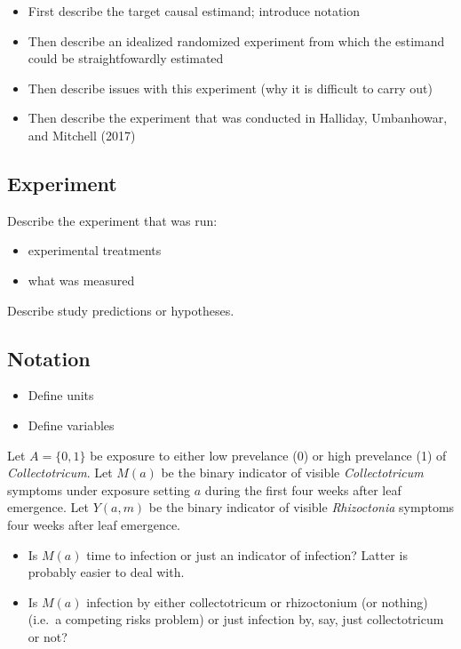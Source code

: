 \documentclass[]{article}
\providecommand{\tightlist}{%
  \setlength{\itemsep}{0pt}\setlength{\parskip}{0pt}}
\begin{document}
\begin{itemize}
\tightlist
\item
  First describe the target causal estimand; introduce notation
\item
  Then describe an idealized randomized experiment from which the
  estimand could be straightfowardly estimated
\item
  Then describe issues with this experiment (why it is difficult to
  carry out)
\item
  Then describe the experiment that was conducted in Halliday,
  Umbanhowar, and Mitchell (2017)
\end{itemize}

\subsection{Experiment}\label{experiment}

Describe the experiment that was run:

\begin{itemize}
\tightlist
\item
  experimental treatments
\item
  what was measured
\end{itemize}

Describe study predictions or hypotheses.

\subsection{Notation}\label{notation}

\begin{itemize}
\tightlist
\item
  Define units
\item
  Define variables
\end{itemize}

Let \(A = \{0, 1\}\) be exposure to either low prevelance (0) or high
prevelance (1) of \emph{Collectotricum}. Let \(M(a)\) be the binary
indicator of visible \emph{Collectotricum} symptoms under exposure
setting \(a\) during the first four weeks after leaf emergence. Let
\(Y(a, m)\) be the binary indicator of visible \emph{Rhizoctonia}
symptoms four weeks after leaf emergence.

\begin{itemize}
\tightlist
\item
  Is \(M(a)\) time to infection or just an indicator of infection?
  Latter is probably easier to deal with.
\item
  Is \(M(a)\) infection by either collectotricum or rhizoctonium (or
  nothing) (i.e.~a competing risks problem) or just infection by, say,
  just collectotricum or not?
\end{itemize}
\end{document}
